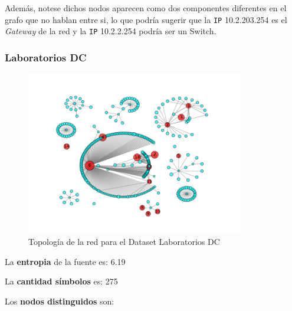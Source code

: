 Además, notese dichos nodos aparecen como dos componentes diferentes en el grafo que no hablan entre si,
lo que podría sugerir que la \texttt{IP} 10.2.203.254 es el \textit{Gateway} de la red
y la \texttt{IP} 10.2.2.254 podría ser un Switch.

\subsubsection{Laboratorios DC}

\begin{figure}[H]
    \centering
    \includegraphics[width=0.85\textwidth]{imagenes/labosDC.png}
    \caption{Topología de la red para el Dataset Laboratorios DC}
\end{figure}

La \textbf{entropia} de la fuente es: 6.19

La \textbf{cantidad símbolos} es: 275

Los \textbf{nodos distinguidos} son:

